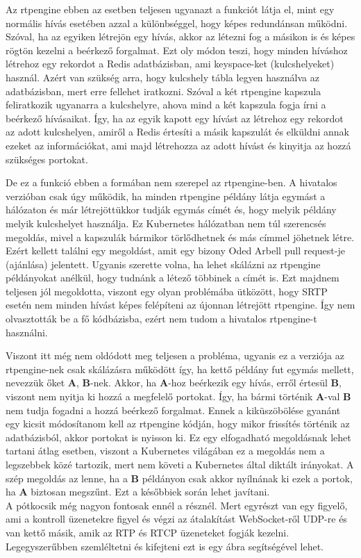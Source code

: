 Az rtpengine ebben az esetben teljesen ugyanazt a funkciót látja el, mint egy normális hívás
esetében azzal a különbséggel, hogy képes redundánsan működni. Szóval, ha az egyiken létrejön
egy hívás, akkor az létezni fog a másikon is és képes rögtön kezelni a beérkező forgalmat. Ezt
oly módon teszi, hogy minden híváshoz létrehoz egy rekordot a Redis adatbázisban, ami 
keyspace-ket (kulcshelyeket) használ. Azért van szükség arra, hogy kulcshely tábla legyen
használva az adatbázisban, mert erre fellehet iratkozni. Szóval a két rtpengine kapszula
feliratkozik ugyanarra a kulcshelyre, ahova mind a két kapszula fogja írni a beérkező hívásaikat.
Így, ha az egyik kapott egy hívást az létrehoz egy rekordot az adott kulcshelyen, amiről a 
Redis értesíti a másik kapszulát és elküldni annak ezeket az információkat, ami majd létrehozza
az adott hívást és kinyitja az hozzá szükséges portokat.  

De ez a funkció ebben a formában nem szerepel az rtpengine-ben. A hivatalos verzióban csak úgy 
működik, ha minden rtpengine példány látja egymást a hálózaton és már létrejöttükkor tudják
egymás címét és, hogy melyik példány melyik kulcshelyet használja. Ez Kubernetes hálózatban
nem túl szerencsés megoldás, mivel a kapszulák bármikor törlődhetnek és más címmel jöhetnek 
létre. Ezért kellett találni egy megoldást, amit egy bizony Oded Arbell pull request-je (ajánlása)
jelentett. Ugyanis szerette volna, ha lehet skálázni az rtpengine példányokat anélkül, hogy 
tudnánk a létező többinek a címét is. Ezt majdnem teljesen jól megoldotta, viszont egy olyan 
problémába ütközött, hogy SRTP esetén nem minden hívást képes felépíteni az újonnan létrejött
rtpengine. Így nem olvasztották be a fő kódbázisba, ezért nem tudom a hivatalos rtpengine-t használni.

Viszont itt még nem oldódott meg teljesen a probléma, ugyanis ez a verziója az rtpengine-nek csak
skálázásra működött így, ha kettő példány fut egymás mellett, nevezzük őket \textbf{A}, 
\textbf{B}-nek. Akkor, ha \textbf{A}-hoz beérkezik egy hívás, erről értesül \textbf{B}, viszont nem
nyitja ki hozzá a megfelelő portokat. Így, ha bármi történik \textbf{A}-val \textbf{B} nem tudja
fogadni a hozzá beérkező forgalmat. Ennek a kiküszöbölése gyanánt egy kicsit módosítanom 
kell az rtpengine kódján, hogy mikor frissítés történik az adatbázisból, akkor portokat is nyisson ki.
Ez egy elfogadható megoldásnak lehet tartani átlag esetben, viszont a Kubernetes világában
ez a megoldás nem a legszebbek közé tartozik, mert nem követi a Kubernetes által diktált
irányokat. A szép megoldás az lenne, ha a \textbf{B} példányon csak akkor nyílnának ki ezek a 
portok, ha \textbf{A} biztosan megszűnt. Ezt a későbbiek során lehet javítani. \\

A pótkocsik még nagyon fontosak ennél a résznél. Mert egyrészt van egy figyelő, ami a kontroll
üzenetekre figyel és végzi az átalakítást WebSocket-ről UDP-re és van kettő másik, amik 
az RTP és RTCP üzeneteket fogják kezelni. Legegyszerűbben szemléltetni és kifejteni ezt is egy 
ábra segítségével lehet. 



 